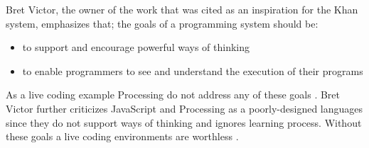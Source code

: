 Bret Victor, the owner of the work that was cited as an inspiration for the Khan system, emphasizes that; the goals of a programming system should be: 

\begin{itemize}

\item to support and encourage powerful ways of thinking
\item to enable programmers to see and understand the execution of their programs

\end{itemize}

As a live coding example Processing do not address any of these goals \cite{14}. Bret Victor further criticizes JavaScript and Processing as a poorly-designed languages since they do not support ways of thinking and ignores learning process. Without these goals a live coding environments are worthless \cite{14}.
